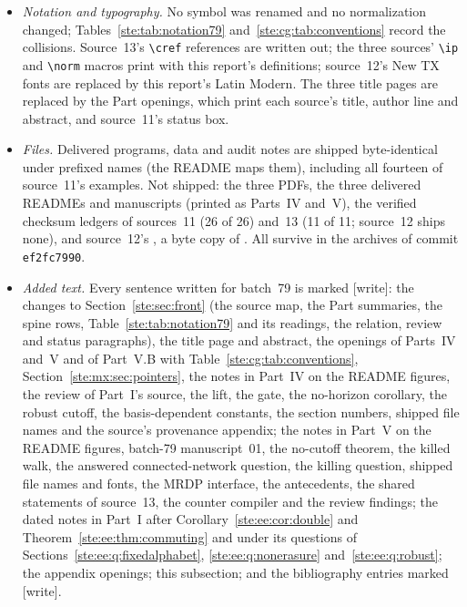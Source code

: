 \documentclass[11pt,letterpaper]{article}
\theoremstyle{definition}
\theoremstyle{remark}
\newcommand{\wtag}{\textup{[write]}}
\begin{document}
\begin{itemize}
\item \emph{Notation and typography.} No symbol was renamed and no normalization changed; Tables~\ref{ste:tab:notation79} and~\ref{ste:cg:tab:conventions} record the collisions. Source~13's \texttt{\textbackslash cref} references are written out; the three sources' \texttt{\textbackslash ip} and \texttt{\textbackslash norm} macros print with this report's definitions; source~12's New TX fonts are replaced by this report's Latin Modern. The three title pages are replaced by the Part openings, which print each source's title, author line and abstract, and source~11's status box.
\item \emph{Files.} Delivered programs, data and audit notes are shipped byte-identical under prefixed names (the README maps them), including all fourteen of source~11's examples. Not shipped: the three PDFs, the three delivered READMEs and manuscripts (printed as Parts~IV and~V), the verified checksum ledgers of sources~11 (26 of 26) and~13 (11 of 11; source~12 ships none), and source~12's , a byte copy of . All survive in the archives of commit \texttt{ef2fc7990}.
\item \emph{Added text.} Every sentence written for batch~79 is marked \wtag: the changes to Section~\ref{ste:sec:front} (the source map, the Part summaries, the spine rows, Table~\ref{ste:tab:notation79} and its readings, the relation, review and status paragraphs), the title page and abstract, the openings of Parts~IV and~V and of Part~V.B with Table~\ref{ste:cg:tab:conventions}, Section~\ref{ste:mx:sec:pointers}, the notes in Part~IV on the README figures, the review of Part~I's source, the lift, the gate, the no-horizon corollary, the robust cutoff, the basis-dependent constants, the section numbers, shipped file names and the source's provenance appendix; the notes in Part~V on the README figures, batch-79 manuscript~01, the no-cutoff theorem, the killed walk, the answered connected-network question, the killing question, shipped file names and fonts, the MRDP interface, the antecedents, the shared statements of source~13, the counter compiler and the review findings; the dated notes in Part~I after Corollary~\ref{ste:ee:cor:double} and Theorem~\ref{ste:ee:thm:commuting} and under its questions of Sections~\ref{ste:ee:q:fixedalphabet}, \ref{ste:ee:q:nonerasure} and~\ref{ste:ee:q:robust}; the appendix openings; this subsection; and the bibliography entries marked \wtag.
\end{itemize}
\end{document}
